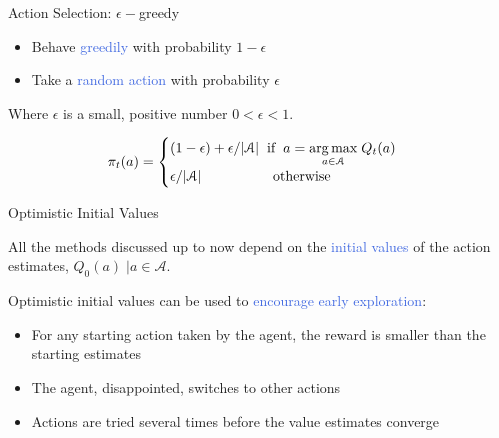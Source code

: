 \documentclass{beamer}
\DeclareMathOperator*{\argmax}{arg\,max}
\begin{document}
\begin{frame}{Action Selection: $\epsilon-$greedy}



\begin{itemize}
    \item Behave \textcolor{RoyalBlue}{greedily} with probability $1-\epsilon$
    \item Take a \textcolor{RoyalBlue}{random action} with probability $\epsilon$
\end{itemize}

\vspace{2mm}

Where $\epsilon$ is a small, positive number $0 < \epsilon < 1$.

\begin{align*}
 \pi_t(a) =
    \begin{cases}
      (1-\epsilon) + \epsilon/|\mathcal{A}| \hspace{2mm} \text{if} \hspace{2mm} a=\underset{a \in \mathcal{A}}{\argmax} \; Q_t(a)\\
       \epsilon/|\mathcal{A}|  \hspace{18mm} \text{otherwise}
    \end{cases}       
\end{align*}


\end{frame}




\begin{frame}{Optimistic Initial Values}

All the methods discussed up to now depend on the \textcolor{RoyalBlue}{initial values} of the action estimates,  $Q_0(a) \; | a \in \mathcal{A}$.

\vspace{5mm}

Optimistic initial values can be used to \textcolor{RoyalBlue}{encourage early exploration}:

\vspace{1mm}
\begin{itemize}
    \item For any starting action taken by the agent, the reward is smaller than the starting estimates
    \item The agent, disappointed, switches to other actions
    \item Actions are tried several times before the value estimates converge
\end{itemize}
\end{frame}
\end{document}
